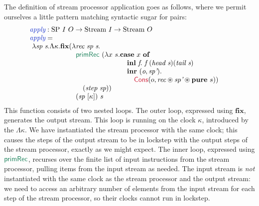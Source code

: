 \documentclass[natbib]{sigplanconf}
\newcommand{\cons}[1]{\textcolor{cons}{\textsf{#1}}}
\newcommand{\elim}[1]{\textcolor{elim}{\textsf{#1}}}
\newcommand{\kw}[1]{\textbf{#1}}
\newcommand{\tyname}[1]{\textrm{#1}}
\newcommand{\ident}[1]{\textit{#1}}
\newcommand{\defn}[1]{\textcolor{defnd}{\ident{#1}}}
\begin{document}
The definition of stream processor application goes as follows, where
we permit ourselves a little pattern matching syntactic sugar for
pairs:
\begin{displaymath}
  \begin{array}{@{}l}
    \defn{apply} : \tyname{SP}~I~O \to \tyname{Stream}~I \to \tyname{Stream}~O \\
    \defn{apply} = \\
    \ \begin{array}[t]{@{}l@{}l}
      \lambda \ident{sp}~\ident{s}.\Lambda \kappa. \kw{fix}(\lambda&\ident{rec}~\ident{sp}~\ident{s}. \\
      & \elim{primRec}~(\lambda x~s.
      \begin{array}[t]{@{}l}
        \kw{case}~x~\kw{of} \\
        \quad \kw{inl}~\ident{f}.~\ident{f}~(\ident{head}~\ident{s}) (\ident{tail}~\ident{s}) \\
        \quad \kw{inr}~(\ident{o},\ident{sp'}).\\
        \quad \quad \cons{Cons}(o,\ident{rec} \circledast \ident{sp'} \circledast \kw{pure}~s))
      \end{array} \\
      & \quad (\ident{step}~\ident{sp})) \\
      & (\ident{sp}~[\kappa])~s
    \end{array}
  \end{array}
\end{displaymath}
This function consists of two nested loops. The outer loop, expressed
using $\kw{fix}$, generates the output stream. This loop is running on
the clock $\kappa$, introduced by the $\Lambda \kappa$. We have
instantiated the stream processor with the same clock; this causes the
steps of the output stream to be in lockstep with the output steps of
the stream processor, exactly as we might expect. The inner loop,
expressed using $\elim{primRec}$, recurses over the finite list of
input instructions from the stream processor, pulling items from the
input stream as needed. The input stream is \emph{not} instantiated
with the same clock as the stream processor and the output stream: we
need to access an arbitrary number of elements from the input stream
for each step of the stream processor, so their clocks cannot run in
lockstep.
\end{document}
